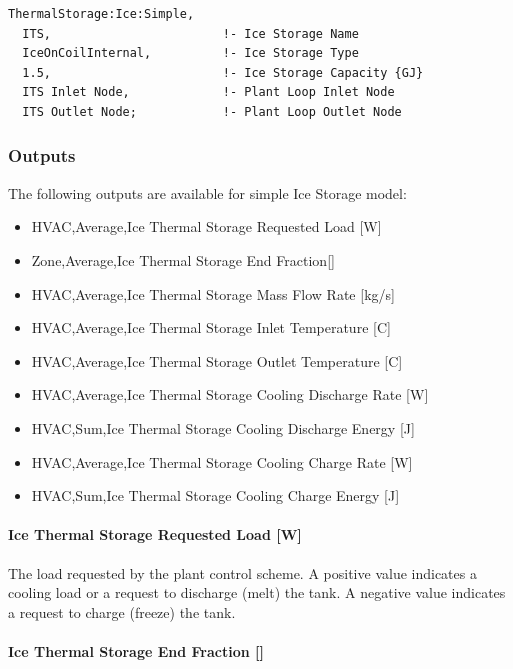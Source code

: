 \begin{lstlisting}
ThermalStorage:Ice:Simple,
  ITS,                        !- Ice Storage Name
  IceOnCoilInternal,          !- Ice Storage Type
  1.5,                        !- Ice Storage Capacity {GJ}
  ITS Inlet Node,             !- Plant Loop Inlet Node
  ITS Outlet Node;            !- Plant Loop Outlet Node
\end{lstlisting}

\subsubsection{Outputs}\label{outputs-18-000}

The following outputs are available for simple Ice Storage model:

\begin{itemize}
\item
  HVAC,Average,Ice Thermal Storage Requested Load {[}W{]}
\item
  Zone,Average,Ice Thermal Storage End Fraction{[]}
\item
  HVAC,Average,Ice Thermal Storage Mass Flow Rate {[}kg/s{]}
\item
  HVAC,Average,Ice Thermal Storage Inlet Temperature {[}C{]}
\item
  HVAC,Average,Ice Thermal Storage Outlet Temperature {[}C{]}
\item
  HVAC,Average,Ice Thermal Storage Cooling Discharge Rate {[}W{]}
\item
  HVAC,Sum,Ice Thermal Storage Cooling Discharge Energy {[}J{]}
\item
  HVAC,Average,Ice Thermal Storage Cooling Charge Rate {[}W{]}
\item
  HVAC,Sum,Ice Thermal Storage Cooling Charge Energy {[}J{]}
\end{itemize}

\paragraph{Ice Thermal Storage Requested Load {[}W{]}}\label{ice-thermal-storage-requested-load-w}

The load requested by the plant control scheme. A positive value indicates a cooling load or a request to discharge (melt) the tank. A negative value indicates a request to charge (freeze) the tank.

\paragraph{Ice Thermal Storage End Fraction {[]}}\label{ice-thermal-storage-end-fraction}

